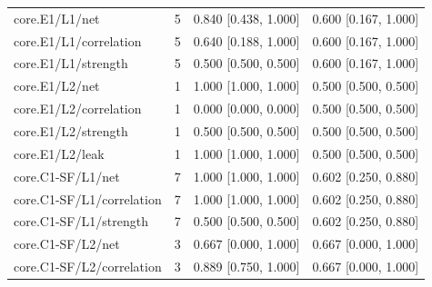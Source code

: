 \begin{longtable}{@{}p{1.9in}rl l@{}}
core.\allowbreak E1/\allowbreak L1/\allowbreak net & 5 & 0.840 [0.438, 1.000] & 0.600 [0.167, 1.000]\\
core.\allowbreak E1/\allowbreak L1/\allowbreak correlation & 5 & 0.640 [0.188, 1.000] & 0.600 [0.167, 1.000]\\
core.\allowbreak E1/\allowbreak L1/\allowbreak strength & 5 & 0.500 [0.500, 0.500] & 0.600 [0.167, 1.000]\\
core.\allowbreak E1/\allowbreak L2/\allowbreak net & 1 & 1.000 [1.000, 1.000] & 0.500 [0.500, 0.500]\\
core.\allowbreak E1/\allowbreak L2/\allowbreak correlation & 1 & 0.000 [0.000, 0.000] & 0.500 [0.500, 0.500]\\
core.\allowbreak E1/\allowbreak L2/\allowbreak strength & 1 & 0.500 [0.500, 0.500] & 0.500 [0.500, 0.500]\\
core.\allowbreak E1/\allowbreak L2/\allowbreak leak & 1 & 1.000 [1.000, 1.000] & 0.500 [0.500, 0.500]\\
core.\allowbreak C1-SF/\allowbreak L1/\allowbreak net & 7 & 1.000 [1.000, 1.000] & 0.602 [0.250, 0.880]\\
core.\allowbreak C1-SF/\allowbreak L1/\allowbreak correlation & 7 & 1.000 [1.000, 1.000] & 0.602 [0.250, 0.880]\\
core.\allowbreak C1-SF/\allowbreak L1/\allowbreak strength & 7 & 0.500 [0.500, 0.500] & 0.602 [0.250, 0.880]\\
core.\allowbreak C1-SF/\allowbreak L2/\allowbreak net & 3 & 0.667 [0.000, 1.000] & 0.667 [0.000, 1.000]\\
core.\allowbreak C1-SF/\allowbreak L2/\allowbreak correlation & 3 & 0.889 [0.750, 1.000] & 0.667 [0.000, 1.000]\\

\end{longtable}
